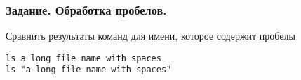 \begin{frame}[fragile]
	\frametitle{Задание. Обработка пробелов.}
Сравнить результаты команд для имени, которое содержит пробелы
				\begin{lstlisting}
ls a long file name with spaces
ls "a long file name with spaces" 
				\end{lstlisting}
\end{frame}
